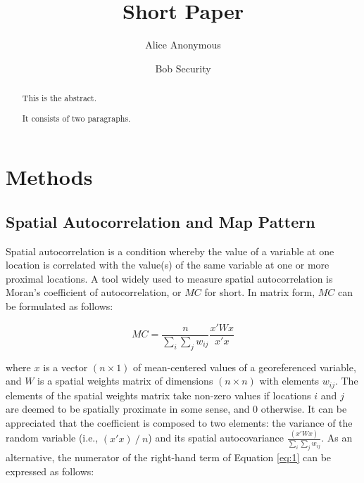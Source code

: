 \documentclass[]{elsarticle} %
\begin{document}
\begin{frontmatter}

  \title{Short Paper}
    \author[Some Institute of Technology]{Alice Anonymous}
    \author[Another University]{Bob Security}
  
      \address[Some Institute of Technology]{Department, Street, City, State, Zip}
    \address[Another University]{Department, Street, City, State, Zip}
  
  \begin{abstract}
  This is the abstract.
  
  It consists of two paragraphs.
  \end{abstract}
  
 \end{frontmatter}

\hypertarget{methods}{%
\section{Methods}\label{methods}}

\hypertarget{spatial-autocorrelation-and-map-pattern}{%
\subsection{Spatial Autocorrelation and Map
Pattern}\label{spatial-autocorrelation-and-map-pattern}}

Spatial autocorrelation is a condition whereby the value of a variable
at one location is correlated with the value(s) of the same variable at
one or more proximal locations. A tool widely used to measure spatial
autocorrelation is Moran's coefficient of autocorrelation, or \(MC\) for
short. In matrix form, \(MC\) can be formulated as follows:

\begin{equation} 
\label{eq:1}
MC=\frac{n}{\sum_{i}{\sum_{j}{w_{ij}}}}\frac{x'Wx}{x'x}
\end{equation}

where \(x\) is a vector \((n\times1)\) of mean-centered values of a
georeferenced variable, and \(W\) is a spatial weights matrix of
dimensions \((n\times n)\) with elements \(w_{ij}\). The elements of the
spatial weights matrix take non-zero values if locations \(i\) and \(j\)
are deemed to be spatially proximate in some sense, and 0 otherwise. It
can be appreciated that the coefficient is composed to two elements: the
variance of the random variable (i.e., \((x' x)⁄n\)) and its spatial
autocovariance \(\frac{(x'Wx)}{\sum_{i}{\sum_{j}{w_{ij}}}}\). As an
alternative, the numerator of the right-hand term of Equation \ref{eq:1}
can be expressed as follows:
\end{document}
